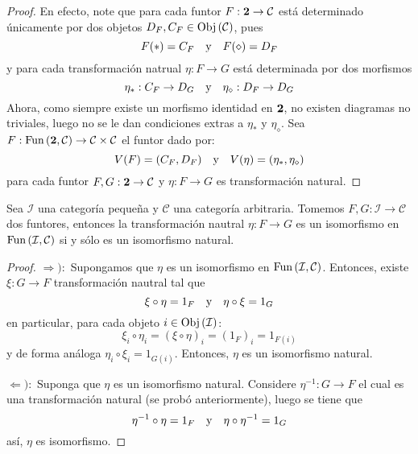\documentclass[12pt]{report}
\theoremstyle{largebreak}
\newcommand\cf[3]{\ensuremath{#1:#2\rightarrow#3}}
\newcommand{\Obj}[1]{\ensuremath{\textup{Obj}\left(#1\right)}}
\newcommand{\Cat}[1]{\ensuremath{\textup{\textbf{#1}}}}
\newcommand{\Fun}[2]{\ensuremath{\textup{Fun}\left(#1,#2\right)}}
\begin{document}
    \begin{proof}
        En efecto, note que para cada funtor $\cf{F}{\Cat{2}}{\mathcal{C}}$ está determinado únicamente por dos objetos $D_F, C_F\in\Obj{\mathcal{C}}$, pues
        \begin{equation*}
            F(*)=C_F\quad\textup{y}\quad F(\diamond)=D_F
        \end{equation*}
        y para cada transformación natrual $\cf{\eta}{F}{G}$ está determinada por dos morfismos
        \begin{equation*}
            \cf{\eta_*}{C_F}{D_G}\quad\textup{y}\quad\cf{\eta_\diamond}{D_F}{D_G}
        \end{equation*}
        Ahora, como siempre existe un morfismo identidad en $\Cat{2}$, no existen diagramas no triviales, luego no se le dan condiciones extras a $\eta_*$ y $\eta_\diamond$. Sea $\cf{F}{\Fun{\Cat{2}}{\mathcal{C}}}{\mathcal{C}\times\mathcal{C}}$ el funtor dado por:
        \begin{equation*}
            V(F)=(C_F,D_F)\quad\textup{y}\quad V(\eta)=(\eta_*,\eta_\diamond)
        \end{equation*}
        para cada funtor $\cf{F,G}{\Cat{2}}{\mathcal{C}}$ y $\cf{\eta}{F}{G}$ es transformación natural.
    \end{proof}

    \begin{propo}
        Sea $\mathcal{I}$ una categoría pequeña y $\mathcal{C}$ una categoría arbitraria. Tomemos $\cf{F,G}{\mathcal{I}}{\mathcal{C}}$ dos funtores, entonces la transformación nautral $\cf{\eta}{F}{G}$ es un isomorfismo en $\Fun{\mathcal{I}}{\mathcal{C}}$ si y sólo es un isomorfismo natural.
    \end{propo}

    \begin{proof}
        $\Rightarrow):$ Supongamos que $\eta$ es un isomorfismo en $\Fun{\mathcal{I}}{\mathcal{C}}$. Entonces, existe $\cf{\xi}{G}{F}$ transformación nautral tal que
        \begin{equation*}
            \xi\circ\eta=1_F\quad\textup{y}\quad\eta\circ\xi=1_G
        \end{equation*}
        en particular, para cada objeto $i\in\Obj{\mathcal{I}}$:
        \begin{equation*}
            \xi_i\circ\eta_i=(\xi\circ\eta)_i=(1_F)_i=1_{F(i)}
        \end{equation*}
        y de forma análoga $\eta_i\circ\xi_i=1_{G(i)}$. Entonces, $\eta$ es un isomorfismo natural.

        $\Leftarrow):$ Suponga que $\eta$ es un isomorfismo natural. Considere $\cf{\eta^{-1}}{G}{F}$ el cual es una transformación natural (se probó anteriormente), luego se tiene que
        \begin{equation*}
            \eta^{-1}\circ\eta=1_F\quad\textup{y}\quad\eta\circ\eta^{-1}=1_G
        \end{equation*}
        así, $\eta$ es isomorfismo.
    \end{proof}
\end{document}
